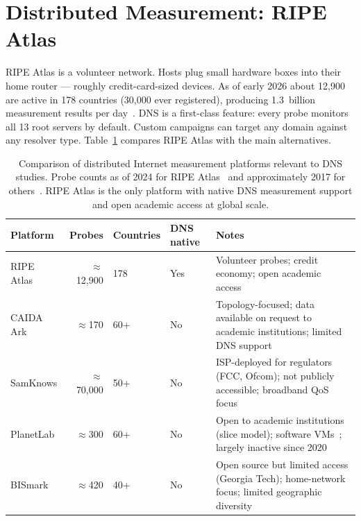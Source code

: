 \section{Distributed Measurement: RIPE Atlas}
\label{sec:2.3}

RIPE Atlas is a volunteer network. Hosts plug small hardware boxes into their home router — roughly credit-card-sized devices. As of early 2026 about 12,900 are active in 178 countries (30,000 ever registered), producing 1.3~billion measurement results per day~\cite{Nosyk2025}. \ac{DNS} is a first-class feature: every probe monitors all 13 root servers by default. Custom campaigns can target any domain against any resolver type. Table~\ref{tab:platforms} compares RIPE Atlas with the main alternatives.

\begin{table}[H]
\centering
\small
\begin{tabularx}{\linewidth}{p{2.6cm} r p{2.0cm} p{1.8cm} X}
\toprule
\textbf{Platform} & \textbf{Probes} & \textbf{Countries} & \textbf{\ac{DNS} native} & \textbf{Notes} \\
\midrule
RIPE Atlas       & $\approx$12,900 & 178 & Yes & Volunteer probes; credit economy; open academic access~\cite{Nosyk2025} \\
CAIDA Ark        & $\approx$170    & 60+ & No  & Topology-focused; data available on request to academic institutions; limited \ac{DNS} support~\cite{Bajpai2017} \\
SamKnows         & $\approx$70,000 & 50+ & No  & \ac{ISP}-deployed for regulators (FCC, Ofcom); not publicly accessible; broadband QoS focus~\cite{Bajpai2017} \\
PlanetLab        & $\approx$300    & 60+ & No  & Open to academic institutions (slice model); software VMs~\cite{Cicalese2015}; largely inactive since 2020 \\
BISmark          & $\approx$420    & 40+ & No  & Open source but limited access (Georgia Tech); home-network focus; limited geographic diversity~\cite{Bajpai2017} \\
\bottomrule
\end{tabularx}
\caption{Comparison of distributed Internet measurement platforms relevant to \ac{DNS} studies. Probe counts as of 2024 for RIPE Atlas~\cite{Nosyk2025} and approximately 2017 for others~\cite{Bajpai2017}. RIPE Atlas is the only platform with native \ac{DNS} measurement support and open academic access at global scale.}
\label{tab:platforms}
\end{table}

